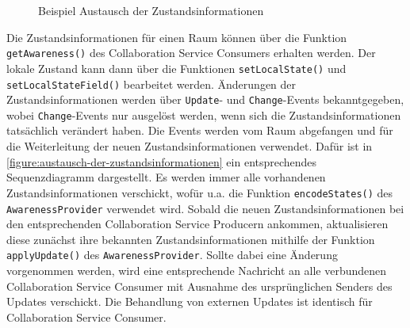 \begin{figure}[tbp]
    \centering

    \caption{Beispiel Austausch der Zustandsinformationen}
    \label{figure:austausch-der-zustandsinformationen}
\end{figure}

Die Zustandsinformationen für einen Raum können über die Funktion \texttt{getAwareness()} des Collaboration Service Consumers erhalten werden. Der lokale Zustand kann dann über die Funktionen \texttt{setLocalState()} und \texttt{setLocalStateField()} bearbeitet werden. Änderungen der Zustandsinformationen werden über \texttt{Update}- und \texttt{Change}-Events bekanntgegeben, wobei \texttt{Change}-Events nur ausgelöst werden, wenn sich die Zustandsinformationen tatsächlich verändert haben. Die Events werden vom Raum abgefangen und für die Weiterleitung der neuen Zustandsinformationen verwendet. Dafür ist in \autoref{figure:austausch-der-zustandsinformationen} ein entsprechendes Sequenzdiagramm dargestellt. Es werden immer alle vorhandenen Zustandsinformationen verschickt, wofür u.a. die Funktion \texttt{encodeStates()} des \texttt{AwarenessProvider} verwendet wird. Sobald die neuen Zustandsinformationen bei den entsprechenden Collaboration Service Producern ankommen, aktualisieren diese zunächst ihre bekannten Zustandsinformationen mithilfe der Funktion \texttt{applyUpdate()} des \texttt{AwarenessProvider}. Sollte dabei eine Änderung vorgenommen werden, wird eine entsprechende Nachricht an alle verbundenen Collaboration Service Consumer mit Ausnahme des ursprünglichen Senders des Updates verschickt. Die Behandlung von externen Updates ist identisch für Collaboration Service Consumer.

